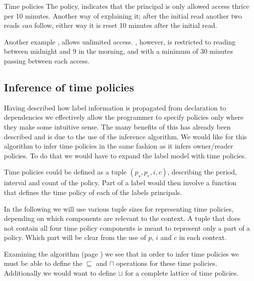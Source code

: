 \begin{example}{Time policies}
  The  policy, indicates that the principal  is only allowed access thrice per 10 minutes.
  Another way of explaining it; after the initial read another two reads \emph{can} follow, either way it is reset 10 minutes after the initial read.

  Another example , allows  unlimited access.
  , however, is restricted to reading between midnight and 9 in the morning, and with a minimum of 30 minutes passing between each access.
\end{example}


\subsection{Inference of time policies}\label{time:inference}
Having described how label information is propagated from declaration to dependencies we effectively allow the programmer to specify policies only where they make some intuitive sense.
The many benefits of this has already been described and is due to the use of the inference algorithm.
We would like for this algorithm to infer time policies in the same fashion as it infers owner/reader policies.
To do that we would have to expand the label model with time policies.

Time policies could be defined as a tuple $(p_s, p_e, i, c)$, describing the period, interval and count of the policy.
Part of a label would then involve a function that defines the time policy of each of the labels principals.

In the following we will use various tuple sizes for representing time policies, depending on which components are relevant to the context.
A tuple that does not contain all four time policy components is meant to represent only a part of a policy.
Which part will be clear from the use of $p$, $i$ and $c$ in each context.

Examining the algorithm (page \pageref{dlm:inf:algorithm}) we see that in order to infer time policies we must be able to define the $\sqsubseteq$ and $\sqcap$ operations for these time policies.
Additionally we would want to define $\sqcup$ for a complete lattice of time policies.

